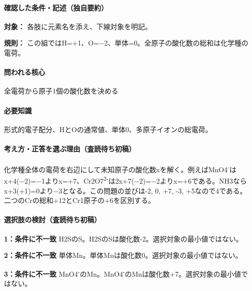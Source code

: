 \paragraph{確認した条件・記述（独自要約）}\mbox{}\par

\noindent\textbf{対象：} 各肢に元素名を添え、下線対象を明記。\par

\noindent\textbf{規則：} この組ではH=+1、O=−2、単体=0。全原子の酸化数の総和は化学種の電荷。\par

\paragraph{問われる核心} 全電荷から原子1個の酸化数を決める

\paragraph{必要知識} 形式的電子配分、HとOの通常値、単体0、多原子イオンの総電荷。

\paragraph{考え方・正答を選ぶ理由（査読待ち初稿）} 化学種全体の電荷を右辺にして未知原子の酸化数xを解く。例えばMnO4\textsuperscript{-}はx+4(−2)=−1よりx=+7、Cr2O7\textsuperscript{2-}は2x+7(−2)=−2よりx=+6である。NH3ならx+3(+1)=\allowbreak{}0より−3となる。この問題の並びは-2, 0, +7, -3, +5なので4である。二つのCrの総和+12とCr1原子の+6を区別する。

\paragraph{選択肢の検討（査読待ち初稿）}\mbox{}\par

\noindent\textbf{1：条件に不一致} H2SのS。H2SのSは酸化数-2。選択対象の最小値ではない。\par

\noindent\textbf{2：条件に不一致} 単体Mn。単体Mnは酸化数0。選択対象の最小値ではない。\par

\noindent\textbf{3：条件に不一致} MnO4\textsuperscript{-}のMn。MnO4\textsuperscript{-}のMnは酸化数+7。選択対象の最小値ではない。\par

